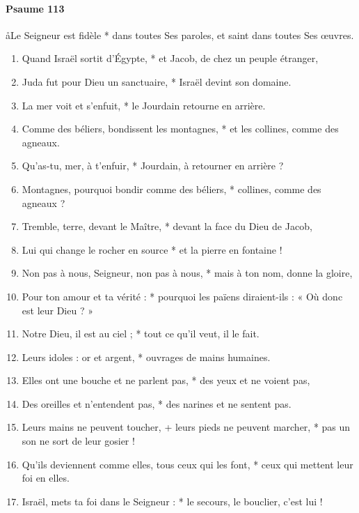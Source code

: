 \documentclass[twoside]{article}
\begin{document}
\begin{paracol}[1]{2}
\switchcolumn

\paragraph{Psaume 113}
\aa Le Seigneur est fidèle * dans toutes Ses paroles, et saint dans toutes Ses œuvres.


\begin{enumerate}[wide, itemsep=0mm, labelwidth=!, labelindent=0pt, label=\color{gregoriocolor}\theenumi]

\item Quand Israël sortit d'Égypte, * et Jacob, de chez un peuple étranger,
\item Juda fut pour Dieu un sanctuaire, * Israël devint son domaine.
\item La mer voit et s'enfuit, * le Jourdain retourne en arrière.
\item Comme des béliers, bondissent les montagnes, * et les collines, comme des agneaux.
\item Qu'as-tu, mer, à t'enfuir, * Jourdain, à retourner en arrière ?
\item Montagnes, pourquoi bondir comme des béliers, * collines, comme des agneaux ?
\item Tremble, terre, devant le Maître, * devant la face du Dieu de Jacob,
\item Lui qui change le rocher en source * et la pierre en fontaine !
\item Non pas à nous, Seigneur, non pas à nous, * mais à ton nom, donne la gloire, 
\item Pour ton amour et ta vérité : * pourquoi les païens diraient-ils : « Où donc est leur Dieu ? »
\item Notre Dieu, il est au ciel ; * tout ce qu'il veut, il le fait.
\item Leurs idoles : or et argent, * ouvrages de mains humaines.
\item Elles ont une bouche et ne parlent pas, * des yeux et ne voient pas,
\item Des oreilles et n'entendent pas, * des narines et ne sentent pas.
\item Leurs mains ne peuvent toucher, + leurs pieds ne peuvent marcher, * pas un son ne sort de leur gosier !
\item Qu'ils deviennent comme elles, tous ceux qui les font, * ceux qui mettent leur foi en elles.
\item Israël, mets ta foi dans le Seigneur : * le secours, le bouclier, c'est lui !

\end{enumerate}
\end{paracol}
\end{document}
